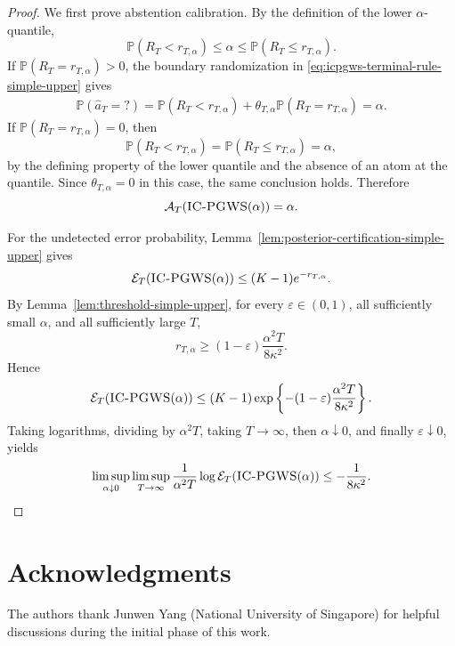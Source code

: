 \documentclass[10pt]{article}
\theoremstyle{plain}
\begin{document}
\begin{proof}
We first prove abstention calibration.  By the definition of the lower
\(\alpha\)-quantile,
\[
    \mathbb P(R_T<r_{T,\alpha})
    \le
    \alpha
    \le
    \mathbb P(R_T\le r_{T,\alpha}).
\]
If \(\mathbb P(R_T=r_{T,\alpha})>0\), the boundary randomization in
\eqref{eq:icpgws-terminal-rule-simple-upper} gives
\[
\begin{aligned}
    \mathbb P(\widehat a_T=?)
    =
    \mathbb P(R_T<r_{T,\alpha})
    +
    \theta_{T,\alpha}
    \mathbb P(R_T=r_{T,\alpha}) 
    =
    \alpha.
\end{aligned}
\]
If \(\mathbb P(R_T=r_{T,\alpha})=0\), then
\[
    \mathbb P(R_T<r_{T,\alpha})
    =
    \mathbb P(R_T\le r_{T,\alpha})
    =
    \alpha,
\]
by the defining property of the lower quantile and the absence of an atom at
the quantile.  Since \(\theta_{T,\alpha}=0\) in this case, the same conclusion
holds.  Therefore
\[
    \mathcal A_T (\textsc{IC-PGWS}(\alpha))=\alpha.
\]

For the undetected error probability,
Lemma~\ref{lem:posterior-certification-simple-upper} gives
\[
    \mathcal E_T (\textsc{IC-PGWS}(\alpha))
    \le
    (K-1)e^{-r_{T,\alpha}}.
\]
By Lemma~\ref{lem:threshold-simple-upper}, for every
\(\varepsilon\in(0,1)\), all sufficiently small \(\alpha\), and all sufficiently
large \(T\),
\[
    r_{T,\alpha}
    \ge
    (1-\varepsilon)\frac{\alpha^2T}{8\kappa^2}.
\]
Hence
\[
    \mathcal E_T(\textsc{IC-PGWS}(\alpha))
    \le
    (K-1)
    \exp\left\{
        -(1-\varepsilon)\frac{\alpha^2T}{8\kappa^2}
    \right\}.
\]
Taking logarithms, dividing by \(\alpha^2T\), taking
\(T\to\infty\), then \(\alpha\downarrow0\), and finally
\(\varepsilon\downarrow0\), yields
\[
    \limsup_{\alpha\downarrow0}
    \limsup_{T\to\infty}
    \frac{1}{\alpha^2T}
    \log \mathcal E_T(\textsc{IC-PGWS}(\alpha))
    \le
    -\frac{1}{8\kappa^2}. 
\]

\end{proof}


\section*{Acknowledgments}
The authors thank Junwen Yang (National University of Singapore) for helpful discussions during the initial phase of this work.



\newpage


\end{document}

